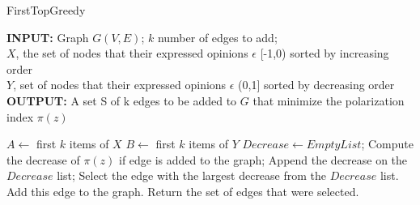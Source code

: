 \begin{algorithm}[htbp]
	\caption{FirstTopGreedy}
	\label{alg:kgreedy}
	
	\begin{flushleft}
        		\textbf{INPUT:} Graph $G(V, E)$; $k$ number of edges to add;\\
		$X$, the set of nodes that their expressed opinions $\epsilon$ [-1,0) sorted by increasing order\\
		$Y$, set of nodes that their expressed opinions $\epsilon$ (0,1]  sorted by decreasing order\\
		\vspace{6pt}
        		\textbf{OUTPUT:} A set S of k edges to be added to $G$ that minimize the polarization \\ index $\pi(z)$
	\end{flushleft}
	
	\begin{algorithmic}[1]
		\STATE $A \leftarrow $ first $k$ items of $X$
		\STATE $B \leftarrow $ first $k$ items of $Y$
			\STATE$Decrease \leftarrow Empty List$;
				\STATE Compute the decrease of $\pi(z)$ if edge is added to the graph;
				\STATE Append the decrease on the $Decrease$ list;
			\ENDFOR
			\STATE Select the edge with the largest decrease from the $Decrease$ list.
			\STATE Add this edge to the graph.
		\ENDFOR
		\STATE Return the set of edges that were selected.
	\end{algorithmic}
	
\end{algorithm}
		
\clearpage

